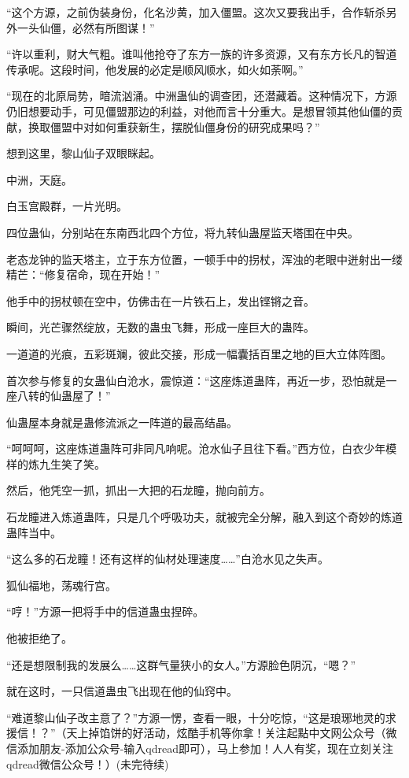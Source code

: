 \begin{this_body}
“这个方源，之前伪装身份，化名沙黄，加入僵盟。这次又要我出手，合作斩杀另外一头仙僵，必然有所图谋！”

“许以重利，财大气粗。谁叫他抢夺了东方一族的许多资源，又有东方长凡的智道传承呢。这段时间，他发展的必定是顺风顺水，如火如荼啊。”

“现在的北原局势，暗流汹涌。中洲蛊仙的调查团，还潜藏着。这种情况下，方源仍旧想要动手，可见僵盟那边的利益，对他而言十分重大。是想冒领其他仙僵的贡献，换取僵盟中对如何重获新生，摆脱仙僵身份的研究成果吗？”

想到这里，黎山仙子双眼眯起。

中洲，天庭。

白玉宫殿群，一片光明。

四位蛊仙，分别站在东南西北四个方位，将九转仙蛊屋监天塔围在中央。

老态龙钟的监天塔主，立于东方位置，一顿手中的拐杖，浑浊的老眼中迸射出一缕精芒：“修复宿命，现在开始！”

他手中的拐杖顿在空中，仿佛击在一片铁石上，发出铿锵之音。

瞬间，光芒骤然绽放，无数的蛊虫飞舞，形成一座巨大的蛊阵。

一道道的光痕，五彩斑斓，彼此交接，形成一幅囊括百里之地的巨大立体阵图。

首次参与修复的女蛊仙白沧水，震惊道：“这座炼道蛊阵，再近一步，恐怕就是一座八转的仙蛊屋了！”

仙蛊屋本身就是蛊修流派之一阵道的最高结晶。

“呵呵呵，这座炼道蛊阵可非同凡响呢。沧水仙子且往下看。”西方位，白衣少年模样的炼九生笑了笑。

然后，他凭空一抓，抓出一大把的石龙瞳，抛向前方。

石龙瞳进入炼道蛊阵，只是几个呼吸功夫，就被完全分解，融入到这个奇妙的炼道蛊阵当中。

“这么多的石龙瞳！还有这样的仙材处理速度……”白沧水见之失声。

狐仙福地，荡魂行宫。

“哼！”方源一把将手中的信道蛊虫捏碎。

他被拒绝了。

“还是想限制我的发展么……这群气量狭小的女人。”方源脸色阴沉，“嗯？”

就在这时，一只信道蛊虫飞出现在他的仙窍中。

“难道黎山仙子改主意了？”方源一愣，查看一眼，十分吃惊，“这是琅琊地灵的求援信！？”（天上掉馅饼的好活动，炫酷手机等你拿！关注起點中文网公众号（微信添加朋友-添加公众号-输入qdread即可），马上参加！人人有奖，现在立刻关注qdread微信公众号！）(未完待续)

\end{this_body}

